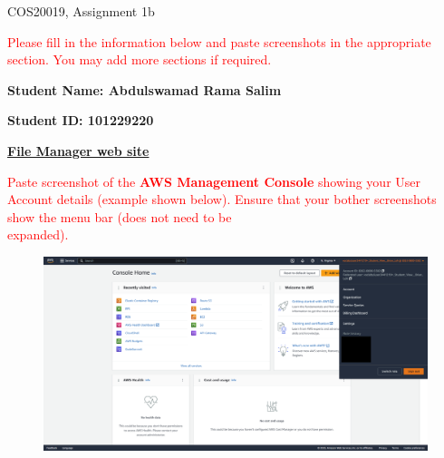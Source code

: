 \documentclass[11pt]{article}
\begin{document}
\noindent COS20019, Assignment 1b

\vspace{0.8cm}

\noindent\textcolor{red}{Please fill in the information below and paste screenshots in the appropriate section. You may add more sections if required.}

\vspace{0.4cm}

\noindent\textbf{Student Name: Abdulswamad Rama Salim} 

\vspace{0.45cm}

\noindent\textbf{Student ID\@: 101229220}

\vspace{1.2cm}

\noindent\underline{\textbf{File Manager web site}}

\vspace{0.6cm}

\noindent\textcolor{red}{Paste screenshot of the \textbf{AWS Management Console} showing your User Account details (example shown below). Ensure that your bother screenshots show the menu bar (does not need to be\\ expanded).}

\vspace{0.6cm}

\begin{figure}[h]
    \centering
    \includegraphics[width=6.2in]{pics/pic.png}
\end{figure}


\vspace{1.5cm}

\newpage
\end{document}
